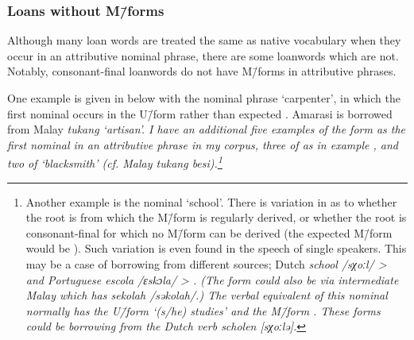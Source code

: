 \subsubsection{Loans without M\=/forms}\label{sec:LoaWithoutMfo}
Although many loan words are treated the same as native vocabulary
when they occur in an attributive nominal phrase,
there are some loanwords which are not.
Notably, consonant-final loanwords do not have M\=/forms in attributive phrases.

One example is given in  below
with the nominal phrase  `carpenter',
in which the first nominal occurs in the U\=/form
rather than expected .
Amarasi  is borrowed from Malay \it{tukang} `artisan'.
I have an additional five examples of the form 
as the first nominal in an attributive phrase in my corpus,
three of  as in example ,
and two of  `blacksmith' (cf. Malay \it{tukang besi}).\footnote{
		Another example is the nominal  {\tl}  `school'.
		There is variation in as to whether the root is  from which the M\=/form
		 is regularly derived, or whether the root is consonant-final 
		for which no M\=/form can be derived (the expected M\=/form would be ).
		Such variation is even found in the speech of single speakers.
		This may be a case of borrowing from different sources;
		Dutch \it{school} /sχoːl/ >  and
		Portuguese \it{escola} /ɛskɔla/ > .
		(The form  could also be via intermediate Malay which has \it{sekolah} /səkolah/.)
		The verbal equivalent of this nominal normally has the U\=/form
		 `(s/he) studies' and the M\=/form .
		These forms could be borrowing from the Dutch verb \it{scholen} [sχoːlə].}

\begin{exe}
	\label{ex:130907-3, 1.23}
\end{exe}

